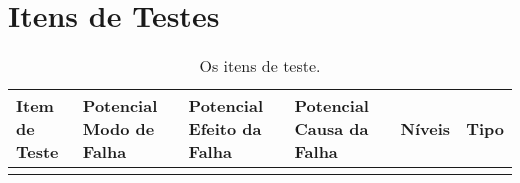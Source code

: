 \chapter[Itens de Testes]{Itens de Testes}


\begin{table}[H]
\centering
\begin{tabular}{|l|l|l|l|l|l|}
\hline
\textbf{Item de Teste} & \textbf{Potencial Modo de Falha} & \textbf{Potencial Efeito da Falha} & \textbf{Potencial Causa da Falha} & \textbf{Níveis} & \textbf{Tipo} \\ \hline
 		&		&		&		&		&               \\ \hline
\end{tabular}
\caption{Os itens de teste.}
\label{itens_teste}
\end{table}
